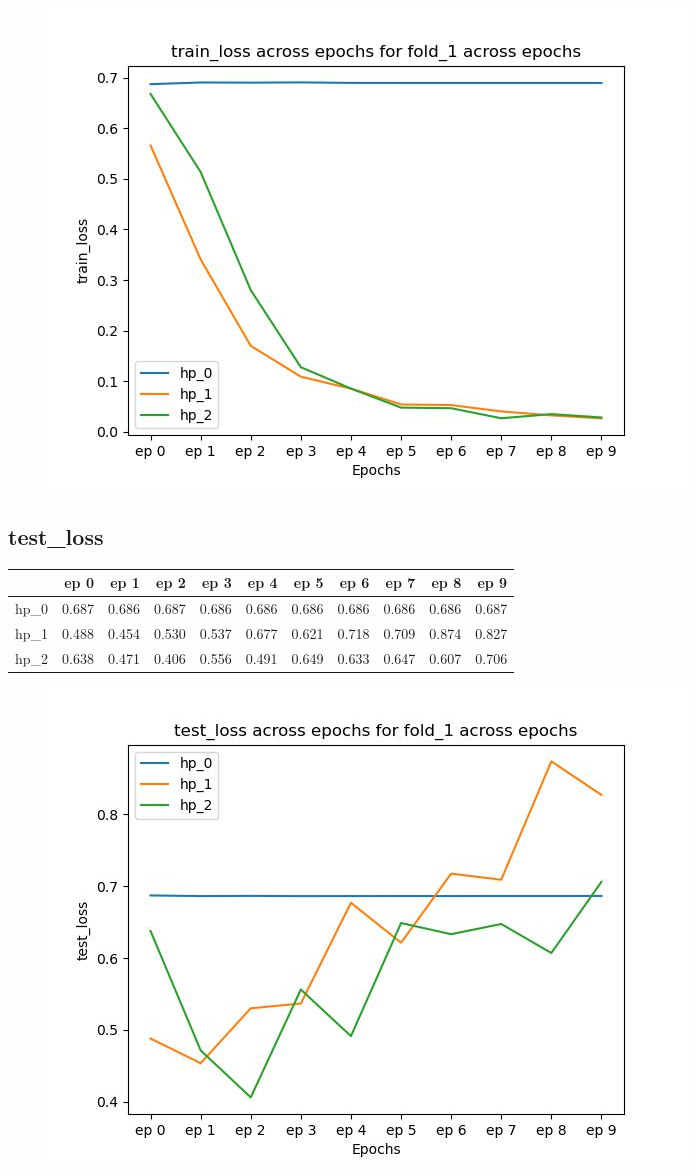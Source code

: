 \documentclass{article}
\begin{document}
\begin{figure}[H]
\includegraphics[scale = 0.75]{fold_1/train_loss}
\end{figure}
\subsection{test\_loss}
\begin{tabular}{lrrrrrrrrrr}
\toprule
{} &   ep 0 &   ep 1 &   ep 2 &   ep 3 &   ep 4 &   ep 5 &   ep 6 &   ep 7 &   ep 8 &   ep 9 \\
\midrule
hp\_0 &  0.687 &  0.686 &  0.687 &  0.686 &  0.686 &  0.686 &  0.686 &  0.686 &  0.686 &  0.687 \\
hp\_1 &  0.488 &  0.454 &  0.530 &  0.537 &  0.677 &  0.621 &  0.718 &  0.709 &  0.874 &  0.827 \\
hp\_2 &  0.638 &  0.471 &  0.406 &  0.556 &  0.491 &  0.649 &  0.633 &  0.647 &  0.607 &  0.706 \\
\bottomrule
\end{tabular}

\begin{figure}[H]
\includegraphics[scale = 0.75]{fold_1/test_loss}
\end{figure}
\end{document}
